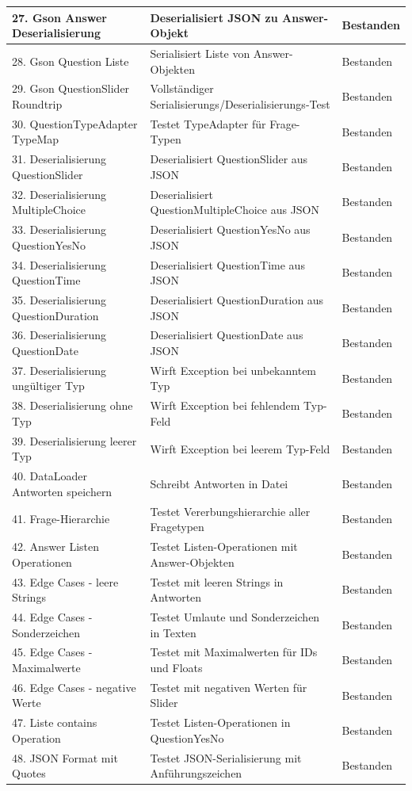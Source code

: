 \begin{tabularx}{\textwidth}{|l|X|l|}
\hline
27. Gson Answer Deserialisierung & Deserialisiert JSON zu Answer-Objekt & Bestanden\\
\hline
28. Gson Question Liste & Serialisiert Liste von Answer-Objekten & Bestanden\\
\hline
29. Gson QuestionSlider Roundtrip & Vollständiger Serialisierungs/Deserialisierungs-Test & Bestanden\\
\hline
30. QuestionTypeAdapter TypeMap & Testet TypeAdapter für Frage-Typen & Bestanden\\
\hline
31. Deserialisierung QuestionSlider & Deserialisiert QuestionSlider aus JSON & Bestanden\\
\hline
32. Deserialisierung MultipleChoice & Deserialisiert QuestionMultipleChoice aus JSON & Bestanden\\
\hline
33. Deserialisierung QuestionYesNo & Deserialisiert QuestionYesNo aus JSON & Bestanden\\
\hline
34. Deserialisierung QuestionTime & Deserialisiert QuestionTime aus JSON & Bestanden\\
\hline
35. Deserialisierung QuestionDuration & Deserialisiert QuestionDuration aus JSON & Bestanden\\
\hline
36. Deserialisierung QuestionDate & Deserialisiert QuestionDate aus JSON & Bestanden\\
\hline
37. Deserialisierung ungültiger Typ & Wirft Exception bei unbekanntem Typ & Bestanden\\
\hline
38. Deserialisierung ohne Typ & Wirft Exception bei fehlendem Typ-Feld & Bestanden\\
\hline
39. Deserialisierung leerer Typ & Wirft Exception bei leerem Typ-Feld & Bestanden\\
\hline
40. DataLoader Antworten speichern & Schreibt Antworten in Datei & Bestanden\\
\hline
41. Frage-Hierarchie & Testet Vererbungshierarchie aller Fragetypen & Bestanden\\
\hline
42. Answer Listen Operationen & Testet Listen-Operationen mit Answer-Objekten & Bestanden\\
\hline
43. Edge Cases - leere Strings & Testet mit leeren Strings in Antworten & Bestanden\\
\hline
44. Edge Cases - Sonderzeichen & Testet Umlaute und Sonderzeichen in Texten & Bestanden\\
\hline
45. Edge Cases - Maximalwerte & Testet mit Maximalwerten für IDs und Floats & Bestanden\\
\hline
46. Edge Cases - negative Werte & Testet mit negativen Werten für Slider & Bestanden\\
\hline
47. Liste contains Operation & Testet Listen-Operationen in QuestionYesNo & Bestanden\\
\hline
48. JSON Format mit Quotes & Testet JSON-Serialisierung mit Anführungszeichen & Bestanden\\
\hline
\end{tabularx}



